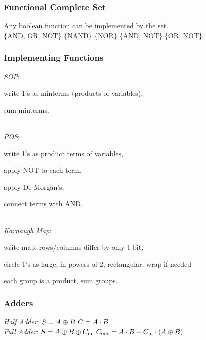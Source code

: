 \subsubsection*{Functional Complete Set}
Any boolean function can be implemented by the set.\\
$\{\text{AND, OR, NOT}\}$\quad
$\{\text{NAND}\}$\quad
$\{\text{NOR}\}$\quad
$\{\text{AND, NOT}\}$\quad
$\{\text{OR, NOT}\}$

\subsubsection*{Implementing Functions}
\emph{SOP}: \begin{enumerate*}[label=(\arabic*)]
    \item write 1's as minterms (products of variables),
    \item sum minterms.
\end{enumerate*}\\
\emph{POS}: \begin{enumerate*}[label=(\arabic*)]
    \item write 1's as product terms of variables,
    \item apply NOT to each term,
    \item apply De Morgan's,
    \item connect terms with AND.
\end{enumerate*}\\
\emph{Karnaugh Map}: \begin{enumerate*}[label=(\arabic*)]
    \item write map, rows/columns differ by only 1 bit,
    \item circle 1's as large, in powers of 2, rectangular, wrap if needed
    \item each group is a product, sum groups.
\end{enumerate*}

\subsubsection*{Adders}
\emph{Half Adder}: $S=A\oplus B$ \quad $C=A\cdot B$\\
\emph{Full Adder}: $S=A\oplus B\oplus C_{\text{in}}$ \quad $C_{\text{out}}=A\cdot B+C_\text{in}\cdot(A\oplus B)$
